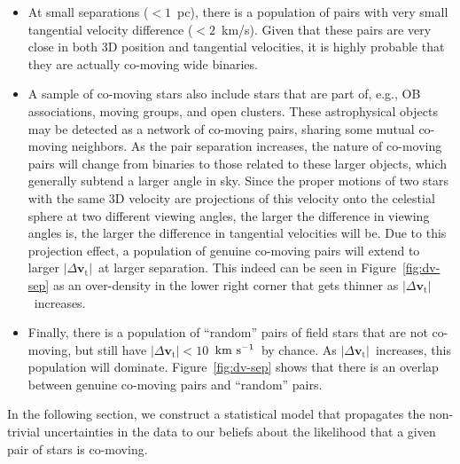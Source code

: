 \documentclass[manuscript, letterpaper]{aastex6}
\newcommand{\bs}[1]{\boldsymbol{#1}}
\renewcommand{\vec}[1]{\bs{#1}}
\newcommand{\kms}{\ensuremath{\rm km~s^{-1}}}
\newcommand{\absdvtan}{\ensuremath{|\Delta\vec v_\mathrm{t}|}}
\begin{document}
\begin{itemize}
  \item At small separations ($<1$~pc), there is a population of pairs with
    very small tangential velocity difference ($<2$~km/s). Given that these
    pairs are very close in both 3D position and tangential velocities, it is highly
    probable that they are actually co-moving wide binaries.

  \item  A sample of co-moving stars also include stars that are part of, e.g.,
    OB associations, moving groups, and open clusters.
    These astrophysical objects may be detected as a network of co-moving pairs,
    sharing some mutual co-moving neighbors.
    As the pair separation increases, the nature of co-moving pairs
    will change from binaries to those related to these larger objects,
    which generally subtend a larger angle in sky.
    Since the proper motions of two stars with the same 3D velocity
    are projections of this velocity onto the celestial sphere at
    two different viewing angles,
    the larger the difference in viewing angles is, the larger the difference in tangential
    velocities will be.
    Due to this projection effect, a population of genuine co-moving pairs
    will extend to larger \absdvtan\ at larger separation.
    This indeed can be seen in Figure~\ref{fig:dv-sep} as an over-density
    in the lower right corner that gets thinner as \absdvtan\ increases.

  \item Finally, there is a population of “random” pairs of field stars
    that are not co-moving, but still have $\absdvtan < 10$~\kms\
    by chance.
    As \absdvtan\ increases, this population will dominate.
    Figure~\ref{fig:dv-sep} shows that there is an overlap between
    genuine co-moving pairs and “random” pairs.
\end{itemize}

In the following section, we construct a statistical model that propagates
the non-trivial uncertainties in the data to our beliefs about the likelihood
that a given pair of stars is co-moving.
\end{document}
